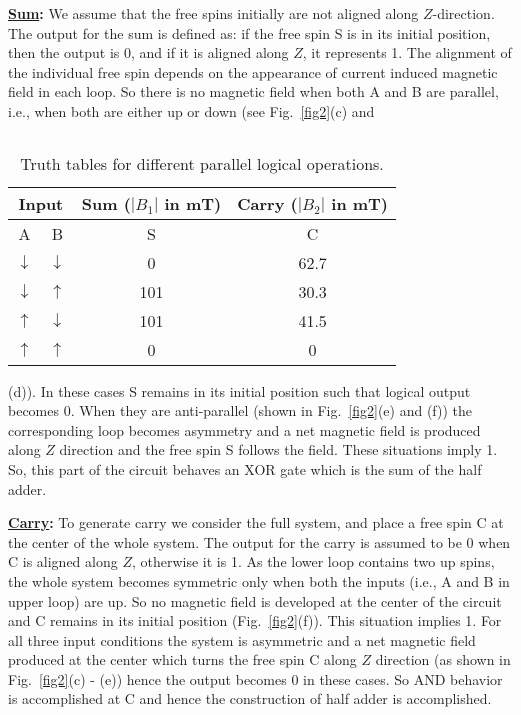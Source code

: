 \documentclass[prb,aps,twocolumn,amsmath,amssymb,floatfix,superscriptaddress]{revtex4}
\begin{document}
\vskip 0.1cm
\noindent
{\bf \underline{Sum}:} We assume that the free spins initially are not aligned
along $Z$-direction. The output for the sum is defined as: if the free spin S is in its
initial position, then the output is 0, and if it is aligned along $Z$, it
represents 1. The alignment of the individual free spin depends
on the appearance of current induced magnetic field in
each loop. So  there is no magnetic field when both A and B are
parallel, i.e., when both are either up or down (see Fig.~\ref{fig2}(c) and
\begin{table}[ht]
\caption{Truth tables for different parallel logical operations.}
$~$
\vskip -0.25cm
\fontsize{7}{11}
\begin{tabular}{|c|c|c|c|}
\hline
\multicolumn{2}{|c|}{Input} & {Sum ($|B_1|$ in mT)} & {Carry ($|B_2|$ in mT)}\\
\hline
A & B & S & C \\
 \hline
$\downarrow$ & $\downarrow$ & 0 &  62.7\\
$\downarrow$ & $\uparrow$ & 101 & 30.3 \\
$\uparrow$ & $\downarrow$ & 101 &  41.5\\
$\uparrow$ & $\uparrow$ & 0 & 0 \\
 \hline
\end{tabular}
\label{tab1}
\end{table}
(d)). In these cases S remains in its initial position such
that logical output becomes 0. When they are anti-parallel (shown in
Fig.~\ref{fig2}(e) and (f)) the corresponding loop becomes asymmetry and a
net magnetic field is produced along $Z$ direction and the free spin S follows
the field. These situations imply 1. So, this part of the circuit behaves an
XOR gate which is the sum of the half adder.

\vskip 0.1cm
\noindent
{\bf \underline{Carry}:} To generate carry we consider the
full system, and place a free spin C at the center of the whole system.
The output for the carry is assumed to be 0 when C is aligned along $Z$,
otherwise it is 1. As the lower loop contains two up spins,
the whole system becomes symmetric only when
both the inputs (i.e., A and B in upper loop) are up. So no magnetic field is
developed at the center of the circuit and C remains in its initial position
(Fig.~\ref{fig2}(f)). This situation implies 1. For all three input conditions
the system is asymmetric and a net magnetic field produced at the center which
turns the free spin C along $Z$ direction (as shown in Fig.~\ref{fig2}(c) - (e))
hence the output becomes $0$ in these cases. So AND behavior is accomplished at C
and hence the construction of half adder is accomplished. 
\end{document}
